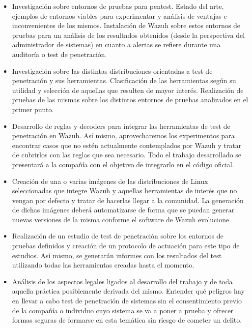 \begin{itemize}
    \item Investigación sobre entornos de pruebas para pentest. Estado del arte, ejemplos de entornos viables para experimentar y análisis de ventajas e inconvenientes de los mismos. Instalación de Wazuh sobre estos entornos de pruebas para un análisis de los resultados obtenidos (desde la perspectiva del administrador de sistemas) en cuanto a alertas se refiere durante una auditoría o test de penetración.

    \item Investigación sobre las distintas distribuciones orientadas a test de penetración y sus herramientas. Clasificación de las herramientas según su utilidad y selección de aquellas que resulten de mayor interés. Realización de pruebas de las mismas sobre los distintos entornos de pruebas analizados en el primer punto.
    
    \item Desarrollo de reglas y decoders para integrar las herramientas de test de penetración en Wazuh. Así mismo, aprovecharemos los experimentos para encontrar casos que no estén actualmente contemplados por Wazuh y tratar de cubrirlos con las reglas que sea necesario. Todo el trabajo desarrollado se presentará a la compañía con el objetivo de integrarlo en el código oficial. 

    \item Creación de una o varias imágenes de las distribuciones de Linux seleccionadas que integre Wazuh y aquellas herramientas de interés que no vengan por defecto y tratar de hacerlas llegar a la comunidad. La generación de dichas imágenes deberá automatizarse de forma que se puedan generar nuevas versiones de la misma conforme el software de Wazuh evolucione.
    
    \item Realización de un estudio de test de penetración sobre los entornos de pruebas definidos y creación de un protocolo de actuación para este tipo de estudios. Así mismo, se generarán informes con los resultados del test utilizando todas las herramientas creadas hasta el momento.
    
    \item Análisis de los aspectos legales ligados al desarrollo del trabajo y de toda aquella práctica posiblemente derivada del mismo. Entender qué peligros hay en llevar a cabo test de penetración de sistemas sin el consentimiento previo de la compañía o individuo cuyo sistema se va a poner a prueba y ofrecer formas seguras de formarse en esta temática sin riesgo de cometer un delito.

\end{itemize}

